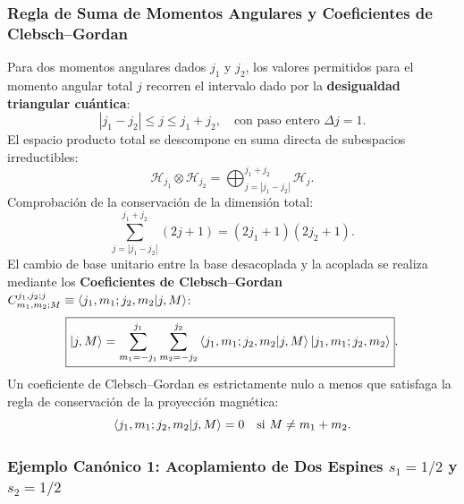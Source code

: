 \subsubsection{Regla de Suma de Momentos Angulares y Coeficientes de Clebsch--Gordan}

Para dos momentos angulares dados $j_1$ y $j_2$, los valores permitidos para el momento angular total $j$ recorren el intervalo dado por la \textbf{desigualdad triangular cuántica}:
\begin{equation}
    \boxed{|j_1 - j_2| \le j \le j_1 + j_2}, \quad \text{con paso entero } \Delta j = 1.
\end{equation}
El espacio producto total se descompone en suma directa de subespacios irreductibles:
\begin{equation}
    \mathcal{H}_{j_1} \otimes \mathcal{H}_{j_2} = \bigoplus_{j=|j_1-j_2|}^{j_1+j_2} \mathcal{H}_j.
\end{equation}
Comprobación de la conservación de la dimensión total:
\begin{equation}
    \sum_{j=|j_1-j_2|}^{j_1+j_2} (2j + 1) = (2j_1 + 1)(2j_2 + 1).
\end{equation}
El cambio de base unitario entre la base desacoplada y la acoplada se realiza mediante los \textbf{Coeficientes de Clebsch--Gordan} $C_{m_1, m_2; M}^{j_1, j_2; j} \equiv \left\langle j_1, m_1; j_2, m_2 \middle| j, M \right\rangle$:
\begin{equation}
    \boxed{\left| j, M \right\rangle = \sum_{m_1=-j_1}^{j_1} \sum_{m_2=-j_2}^{j_2} \left\langle j_1, m_1; j_2, m_2 \middle| j, M \right\rangle \left| j_1, m_1; j_2, m_2 \right\rangle}.
\end{equation}
Un coeficiente de Clebsch--Gordan es estrictamente nulo a menos que satisfaga la regla de conservación de la proyección magnética:
\begin{equation}
    \left\langle j_1, m_1; j_2, m_2 \middle| j, M \right\rangle = 0 \quad \text{si } M \neq m_1 + m_2.
\end{equation}

\subsubsection{Ejemplo Canónico 1: Acoplamiento de Dos Espines \texorpdfstring{$s_1 = 1/2$}{s1=1/2} y \texorpdfstring{$s_2 = 1/2$}{s2=1/2}}

